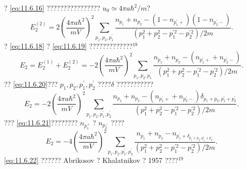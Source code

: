 ? \autoref{eq:11.6.16} ???????????????? \(u_0 \simeq 4\pi a\hbar^2/m\)?
\begin{equation}\tag{11.6.28}\label{eq:11.6.28}
E _ { 2 } ^{( 2 )} = 2 \left( \frac { 4 \pi a \hbar ^{2} } { m V } \right) ^{2} \sum _ { p _ { 1 } , p _ { 2 } , p _ { 1 } ^{\prime} } \frac { n _ { p _ { 1 } } + n _ { p _ { 2 } } - \left( 1 - n _ { p _ { 1 } ^{\prime} + } \right) \left( 1 - n _ { p _ { 2 } ^{\prime} - } \right) } { \left( p _ { 1 } ^{2} + p _ { 2 } ^{2} - p _ { 1 } ^{\prime 2} - p _ { 2 } ^{\prime 2} \right) / 2 m } .
\end{equation}
? \autoref{eq:11.6.18} ? \autoref{eq:11.6.19} ?????????????\(^{18}\)
\begin{equation}\tag{11.6.29}\label{eq:11.6.29}
E _ { 2 } = E _ { 2 } ^{( 1 )} + E _ { 2 } ^{( 2 )} = - 2 \left( \frac { 4 \pi a \hbar ^{2} } { m V } \right) ^{2} \sum _ { p _ { 1 } , p _ { 2 } , p _ { 1 } ^{\prime} } \frac { n _ { p _ { 1 } } + n _ { p _ { 2 } } - \left( n _ { p _ { 1 } ^{\prime} + } + n _ { p _ { 2 } ^{\prime} - } \right) } { \left( p _ { 1 } ^{2} + p _ { 2 } ^{2} - p _ { 1 } ^{\prime 2} - p _ { 2 } ^{\prime 2} \right) / 2 m } .
\end{equation}
?? \autoref{eq:11.6.20}??? \(p_{1},p_{2},p_{1}^{\prime},p_{2}^{\prime}\) ????\(\delta\) ???????????
\begin{equation}\tag{11.6.30}\label{eq:11.6.30}
E _ { 2 } = - 2 \left( \frac { 4 \pi a \hbar ^{2} } { m V } \right) ^{2} \sum _ { p _ { 1 } , p _ { 2 } , p _ { 1 } ^{\prime} , p _ { 2 } ^{\prime} } \frac { n _ { p _ { 1 } } + n _ { p _ { 2 } } - \left( n _ { p _ { 1 } ^{\prime} + } + n _ { p _ { 2 } ^{\prime} - } \right) \delta _ { p _ { 1 } + p _ { 2 } , p _ { 1 } ^{\prime} + p _ { 2 } ^{\prime} } } { \left( p _ { 1 } ^{2} + p _ { 2 } ^{2} - p _ { 1 } ^{\prime 2} - p _ { 2 } ^{\prime 2} \right) / 2 m } .
\end{equation}
??? \autoref{eq:11.6.21}???????? \(n_{p_{1}^{+}}\) ? \(n_{p_{2}^{-}}\) ????
\begin{equation}\tag{11.6.31}\label{eq:11.6.31}
E _ { 2 } = - 4 \left( \frac { 4 \pi a \hbar ^{2} } { m V } \right) ^{2} \sum _ { p _ { 1 } , p _ { 2 } , p _ { 1 } ^{\prime} , p _ { 2 } ^{\prime} } \frac { n _ { p _ { 1 } } + n _ { p _ { 2 } } - n _ { p _ { 1 } ^{\prime} + \delta _ { p _ { 1 } + p _ { 2 } , p _ { 1 } ^{\prime} + p _ { 2 } ^{\prime} } } } { \left( p _ { 1 } ^{2} + p _ { 2 } ^{2} - p _ { 1 } ^{\prime 2} - p _ { 2 } ^{\prime 2} \right) / 2 m } .
\end{equation}
\autoref{eq:11.6.22} ?????? Abrikosov ? Khalatnikov ? 1957 ????\(^{19}\)
